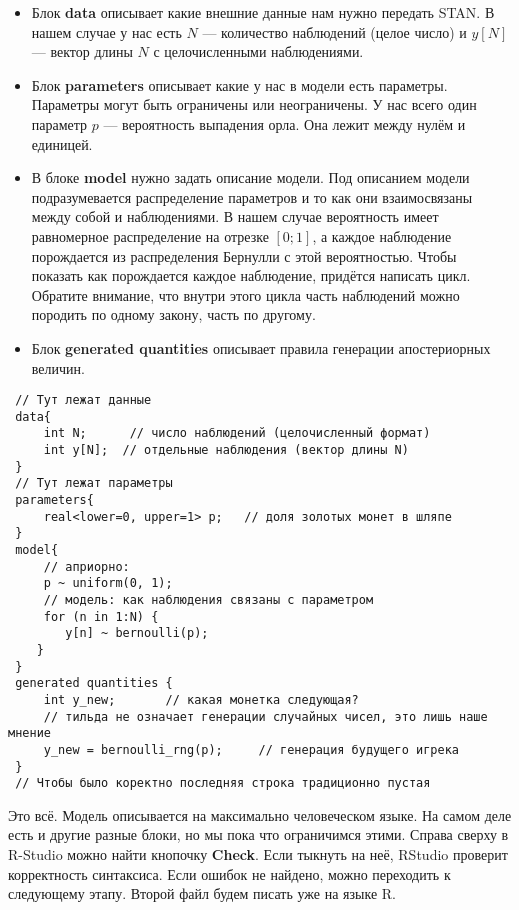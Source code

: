  \begin{itemize}
 	\item  Блок \textbf{data} описывает какие внешние данные нам нужно передать STAN.  В нашем случае у нас есть  $N$ --- количество наблюдений (целое число) и $y[N]$ --- вектор длины $N$ с целочисленными наблюдениями. 
 	
 	\item Блок \textbf{parameters} описывает какие у нас в модели есть параметры. Параметры могут быть ограничены или неограничены.  У нас всего один параметр  $p$ ---  вероятность выпадения орла. Она лежит между нулём и единицей. 
 	
 	\item В блоке \textbf{model} нужно задать описание модели. Под описанием модели подразумевается распределение параметров и то как они взаимосвязаны между собой и наблюдениями.  В нашем случае вероятность имеет равномерное распределение на отрезке $[0;1]$, а каждое наблюдение порождается из распределения Бернулли с этой вероятностью.  Чтобы показать как порождается каждое наблюдение, придётся написать цикл. Обратите внимание, что внутри этого цикла часть наблюдений можно породить по одному закону, часть по другому.
 	
 	\item Блок \textbf{generated quantities} описывает правила генерации апостериорных величин. 
 \end{itemize}
 
 \begin{center}
  \begin{verbatim}
 // Тут лежат данные
 data{
     int N;      // число наблюдений (целочисленный формат)
     int y[N];  // отдельные наблюдения (вектор длины N)
 }
 // Тут лежат параметры
 parameters{
     real<lower=0, upper=1> p;   // доля золотых монет в шляпе
 }
 model{
     // априорно:
     p ~ uniform(0, 1);
     // модель: как наблюдения связаны с параметром
     for (n in 1:N) {
        y[n] ~ bernoulli(p);
    }
 }
 generated quantities {
     int y_new;       // какая монетка следующая?
     // тильда не означает генерации случайных чисел, это лишь наше мнение
     y_new = bernoulli_rng(p);     // генерация будущего игрека
 }
 // Чтобы было коректно последняя строка традиционно пустая
 \end{verbatim}
 \end{center} 
 

 Это всё. Модель описывается на максимально человеческом языке.  На самом деле есть и другие разные блоки, но мы пока что ограничимся этими.  Справа сверху в R-Studio можно найти кнопочку \textbf{Check}. Если тыкнуть на неё, RStudio проверит корректность синтаксиса. Если ошибок не найдено, можно переходить к следующему этапу.  Второй файл будем писать уже на языке R. 
 
